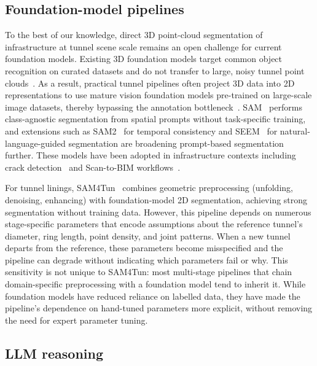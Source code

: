 \documentclass[a4paper,fleqn]{cas-dc}
\begin{document}
{\subsection{Foundation-model pipelines}

To the best of our knowledge, direct 3D point-cloud segmentation of infrastructure at tunnel scene scale remains an open challenge for current foundation models. Existing 3D foundation models target common object recognition on curated datasets and do not transfer to large, noisy tunnel point clouds~\cite{camuffo2022recent, liu2023openshape, guo2023pointbind, xu2024pointllm}. As a result, practical tunnel pipelines often project 3D data into 2D representations to use mature vision foundation models pre-trained on large-scale image datasets, thereby bypassing the annotation bottleneck~\cite{caron2021dino, franceschelli2024training}. SAM~\cite{kirillov2023sam} performs class-agnostic segmentation from spatial prompts without task-specific training, and extensions such as SAM2~\cite{ravi2024sam2} for temporal consistency and SEEM~\cite{zou2023segment} for natural-language-guided segmentation are broadening prompt-based segmentation further. These models have been adopted in infrastructure contexts including crack detection~\cite{ge2024cracksam} and Scan-to-BIM workflows~\cite{wang2024omni, pan2024zero}.

For tunnel linings, SAM4Tun~\cite{ye2025sam4tun} combines geometric preprocessing (unfolding, denoising, enhancing) with foundation-model 2D segmentation, achieving strong segmentation without training data. However, this pipeline depends on numerous stage-specific parameters that encode assumptions about the reference tunnel's diameter, ring length, point density, and joint patterns. When a new tunnel departs from the reference, these parameters become misspecified and the pipeline can degrade without indicating which parameters fail or why. This sensitivity is not unique to SAM4Tun: most multi-stage pipelines that chain domain-specific preprocessing with a foundation model tend to inherit it. While foundation models have reduced reliance on labelled data, they have made the pipeline's dependence on hand-tuned parameters more explicit, without removing the need for expert parameter tuning.

\subsection{LLM reasoning}

}
\end{document}
